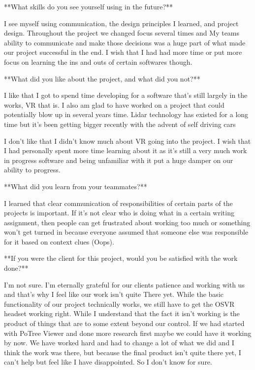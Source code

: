 \documentclass[draftclsnofoot,onecolumn]{IEEEtran}
\begin{document}
**What skills do you see yourself using in the future?**

I see myself using communication, the design principles I learned, and project design. Throughout the project we changed focus several times and My teams ability to communicate and make those decisions was a huge part of what made our project successful in the end. I wish that I had had more time or put more focus on learning the ins and outs of certain softwares though.

**What did you like about the project, and what did you not?**

I like that I got to spend time developing for a software that's still largely in the works, VR that is. I also am glad to have worked on a project that could potentially blow up in several years time. Lidar technology has existed for a long time but it's been getting bigger recently with the advent of self driving cars 

I don't like that I didn't know much about VR going into the project. I wish that I had personally spent more time learning about it as it's still a very much work in progress software and being unfamiliar with it put a huge damper on our ability to progress.

**What did you learn from your teammates?**

I learned that clear communication of responsibilities of certain parts of the projects is important. If it's not clear who is doing what in a certain writing assignment, then people can get frustrated about working too much or something won't get turned in because everyone assumed that someone else was responsible for it based on context clues (Oops).

**If you were the client for this project, would you be satisfied with the work done?**

I'm not sure. I'm eternally grateful for our clients patience and working with us and that's why I feel like our work isn't quite There yet. While the basic functionality of our project technically works, we still have to get the OSVR headset working right. While I understand that the fact it isn't working is the product of things that are to some extent beyond our control. If we had started with PoTree Viewer and done more research first maybe we could have it working by now. We have worked hard and had to change a lot of what we did and I think the work was there, but because the final product isn't quite there yet, I can't help but feel like I have disappointed. So I don't know for sure.
\end{document}
